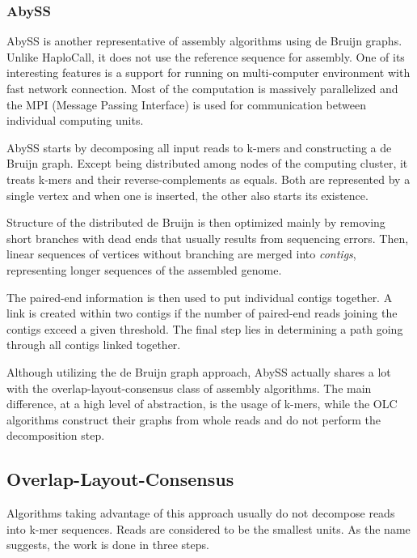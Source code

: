 \subsubsection{AbySS} 
\label{subsub:abyss} 

AbySS\cite{abyss} is another representative of assembly algorithms using de Bruijn graphs. Unlike HaploCall, it does not use the reference sequence for assembly. One of its interesting features is a support for running on multi-computer environment with fast network connection. Most of the computation is massively parallelized and the MPI (Message Passing Interface) is used for communication between individual computing units. 

AbySS starts by decomposing all input reads to k-mers and constructing a de Bruijn graph. Except being distributed among nodes of the computing cluster, it treats k-mers and their reverse-complements as equals. Both are represented by a single vertex and when one is inserted, the other also starts its existence.  

Structure of the distributed de Bruijn is then optimized mainly by removing short branches with dead ends that usually results from sequencing errors. Then, linear sequences of vertices without branching are merged into \textit{contigs}, representing longer sequences of the assembled genome.  

The paired-end information is then used to put individual contigs together. A link is created within two contigs if the number of paired-end reads joining the contigs exceed a given threshold. The final step lies in determining a path going through all contigs linked together. 

Although utilizing the de Bruijn graph approach, AbySS actually shares a lot with the overlap-layout-consensus class of assembly algorithms. The main difference, at a high level of abstraction, is the usage of k-mers, while the OLC algorithms construct their graphs from whole reads and do not perform the decomposition step. 

\subsection{Overlap-Layout-Consensus} 
\label{subsec:overlap-layout-consensus} 

Algorithms taking advantage of this approach usually do not decompose reads into k-mer sequences. Reads are considered to be the smallest units. As the name suggests, the work is done in three steps. 

